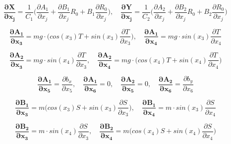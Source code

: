 \documentclass[10pt]{article}
\begin{document}
\newpage

\begin{equation}
\boldsymbol{\frac{\partial X}{\partial x_j}} = \frac{1}{C_1} \bigg(
{\frac{\partial A_1}{\partial x_j} + \frac{\partial B_1}{\partial x_j} R_0 + B_1 \frac{\partial R_0}{\partial x_j}}
\bigg), \quad
\boldsymbol{\frac{\partial Y}{\partial x_j}} = \frac{1}{C_2} \bigg(
{\frac{\partial A_2}{\partial x_j} + \frac{\partial B_2}{\partial x_j} R_0 + B_2 \frac{\partial R_0}{\partial x_j}}
\bigg)
\end{equation}

\begin{equation}
\boldsymbol{\frac{\partial A_1}{\partial x_3}} = mg \cdot \big( cos(x_3)T + sin(x_3) \frac{\partial T}{\partial x_3} \big), \quad
\boldsymbol{\frac{\partial A_1}{\partial x_4}} = mg \cdot sin(x_3) \frac{\partial T}{\partial x_4}
\end{equation}

\begin{equation}
\boldsymbol{\frac{\partial A_2}{\partial x_3}} = mg \cdot sin(x_4) \frac{\partial T}{\partial x_3}, \quad
\boldsymbol{\frac{\partial A_2}{\partial x_4}} = mg \cdot \big( cos(x_4)T + sin(x_4) \frac{\partial T}{\partial x_4} \big)
\end{equation}

\begin{equation}
\boldsymbol{\frac{\partial A_1}{\partial x_5}} = \frac{\partial b_x}{\partial x_5}, \quad
\boldsymbol{\frac{\partial A_1}{\partial x_6}} = 0, \quad
\boldsymbol{\frac{\partial A_2}{\partial x_5}} = 0, \quad
\boldsymbol{\frac{\partial A_2}{\partial x_6}} = \frac{\partial b_y}{\partial x_6}
\end{equation}

\begin{equation}
\boldsymbol{\frac{\partial B_1}{\partial x_3}} = m \Big(cos(x_3)S + sin(x_3) \frac{\partial S}{\partial x_3} \Big), \quad
\boldsymbol{\frac{\partial B_1}{\partial x_4}} = m \cdot sin(x_3) \frac{\partial S}{\partial x_4}
\end{equation}

\begin{equation}
\boldsymbol{\frac{\partial B_2}{\partial x_3}} = m \cdot sin(x_4) \frac{\partial S}{\partial x_3}, \quad
\boldsymbol{\frac{\partial B_2}{\partial x_4}} = m \Big(cos(x_4)S + sin(x_4) \frac{\partial S}{\partial x_4} \Big)
\end{equation}
\end{document}
